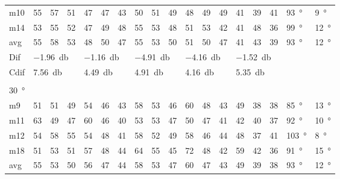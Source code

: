 \begin{table}[H]
\begin{tabular}{l|l|l|l|l|l|l|l|l|l|l|l|l|l|l|l|l|l}
m10  &  55    &  57    &  51    &  47    &   47   &   43   &   50   &   51    &   49   &  48     & 49     & 49     & 41 & 39 &41  & \SI{93}{\degree} & \SI{9}{\degree}  \\
m14  &  53    &  55    &  52    &  47    &  49    &   48   &    55  &  53     &   48   &  51     &  53    &  42    & 41 & 48 & 36  & \SI{99}{\degree} & \SI{12}{\degree} \\ \hline
avg & 55     &  58    &  53    &   48   &  50    &  47    &  55    &   53    &  50    &  51     & 50     &  47    & 41 & 43  & 39   & \SI{93}{\degree} & \SI{12}{\degree} \\ \hline  
Dif & \multicolumn{3}{l|}{\SI{-1.96}{\decibel}} & \multicolumn{3}{l|}{\SI{-1.16}{\decibel}} & \multicolumn{3}{l|}{\SI{-4.91}{\decibel}} & \multicolumn{3}{l|}{\SI{-4.16}{\decibel}} &  \multicolumn{3}{l|}{\SI{-1.52}{\decibel}} &  \multicolumn{2}{l}{}  \\ \hline 
Cdif & \multicolumn{3}{l|}{\SI{7.56}{\decibel}} & \multicolumn{3}{l|}{\SI{4.49}{\decibel}} & \multicolumn{3}{l|}{\SI{4.91}{\decibel}} & \multicolumn{3}{l|}{\SI{4.16}{\decibel}} & \multicolumn{3}{l|}{\SI{5.35}{\decibel}}  &   \multicolumn{2}{l}{}   \\ 
 \multicolumn{18}{l}{ } \\                         
\SI{30}{\degree}   & \multicolumn{3}{l|}{} & \multicolumn{3}{l|}{} & \multicolumn{3}{l|}{} & \multicolumn{3}{l|}{} &  \multicolumn{3}{l|}{}   &  \multicolumn{2}{l}{} \\  \hline
m9    &  51    &  51    &  49    &  54    &  46    &   43   &  58    &   53    &  46    &   60    &   48   &   43   & 49 & 38 & 38  & \SI{85}{\degree} & \SI{13}{\degree} \\
m11  &  63    &  49    &  47    &   60   &   46   &   40   &  53    &   53    &  47    &    50   &   47   &  41   & 42 & 40 & 37  & \SI{92}{\degree} & \SI{10}{\degree} \\
m12  &  54    &   58   &  55    &  54    &   48   &   41   &   58   &  52     &   49   &    58   &   46   &   44   & 48 & 37 & 41  & \SI{103}{\degree} & \SI{8}{\degree} \\
m18  &  51    &   53   &  51    &   57   &  48    &   44   &   64   &   55    &  45    &    72   &  48    &   42   & 59 & 42 & 36  & \SI{91}{\degree} & \SI{15}{\degree} \\ \hline
avg &  55    &  53    &  50    &  56    & 47     &  44    &   58   &  53     &  47    &  60     &   47   &  43    & 49 & 39  & 38  & \SI{93}{\degree} & \SI{12}{\degree} \\ \hline  

\end{tabular}
\end{table}
